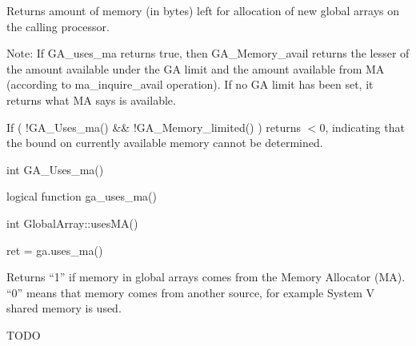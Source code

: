 \documentclass[10pt]{article}
\begin{document}
\local

\begin{desc}

Returns amount of memory (in bytes) left for allocation of new global arrays on
the calling processor.

Note: If GA_uses_ma returns true, then GA_Memory_avail returns the lesser of
the amount available under the GA limit and the amount available from MA
(according to ma_inquire_avail operation). If no GA limit has been set, it
returns what MA says is available.

If ( !GA_Uses_ma() \&\& !GA_Memory_limited() ) returns $< 0$, indicating
that the bound on currently available memory cannot be determined.

\end{desc}


\begin{capi}
\begin{ccode}
int GA_Uses_ma()
\end{ccode}
\end{capi}

\begin{fapi}
\begin{fcode}
logical function ga_uses_ma()
\end{fcode}
\end{fapi}

\begin{cxxapi}
\begin{cxxcode}
int GlobalArray::usesMA()
\end{cxxcode}
\end{cxxapi}

\begin{pyapi}
\begin{pycode}
ret = ga.uses_ma()
\end{pycode}
\end{pyapi}

\local

\begin{desc}

Returns ``1'' if memory in global arrays comes from the Memory Allocator (MA).
``0'' means that memory comes from another source, for example System V shared
memory is used.

TODO

\end{desc}

\end{document}
